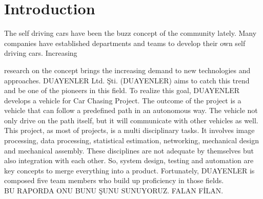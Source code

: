 \documentclass[a4paper,12pt]{article}
\begin{document}

\tableofcontents

\newpage


\section{Introduction}

The self driving cars have been the buzz concept of the community lately. Many companies have established departments and teams to develop their own self driving cars. Increasing 

research on the concept brings the increasing demand to new technologies and approaches. DUAYENLER Ltd. Şti. (DUAYENLER) aims to catch this trend and be one of the pioneers in this field. To realize this goal, DUAYENLER develops a vehicle for Car Chasing Project. The outcome of the project is a vehicle that can follow a predefined path in an autonomous way. The vehicle not only drive on the path itself, but it will communicate with other vehicles as well.\\


This project, as most of projects, is a multi disciplinary tasks. It involves image processing, data processing, statistical estimation, networking, mechanical design and mechanical assembly. These disciplines are not adequate by themselves but also integration with each other. So, system design, testing and automation are key concepts to merge everything into a product. Fortunately, DUAYENLER is composed five team members who build up proficiency in those fields.\\




BU RAPORDA ONU BUNU ŞUNU SUNUYORUZ. FALAN FİLAN.





\newpage
\end{document}
